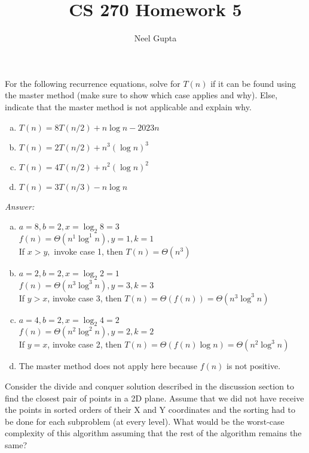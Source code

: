 \documentclass[12pt]{article}
\newenvironment{problem}[2][Problem]{\begin{trivlist}
\item[\hskip \labelsep {\bfseries #1}\hskip \labelsep {\bfseries #2.}]}{\end{trivlist}}
\begin{document}

\title{\vspace{-4cm}CS 270 Homework 5}
\author{Neel Gupta} 
\maketitle

\begin{problem}{1}
    For the following recurrence equations, solve for $T(n)$ if it can be found using the master method (make sure to show which case applies and why). Else, indicate that the master method is not applicable and explain why.
    \begin{enumerate}[(a)]
        \item $T(n) = 8T(n/2) + n\log n - 2023n$
        \item $T(n)=2T(n/2)+n^3 (\log n)^3$
        \item $T(n)=4T(n/2)+n^2 (\log n)^2$
        \item $T(n)=3T(n/3)-n\log n$
    \end{enumerate}
\end{problem}
\textit{Answer:}
\begin{enumerate}[(a)]
    \item $a=8, b=2, x = \log_2 8 = 3$ \\ $f(n) = \Theta(n^1\log^1 n), y=1,k=1$ \\ If $x>y,$ invoke case 1, then $T(n)=\Theta(n^3)$
    \item $a=2,b=2, x=\log_2 2=1$ \\ $f(n) = \Theta(n^3\log^3 n), y=3,k=3$\\ If $y>x$, invoke case 3, then $T(n)=\Theta(f(n)) = \Theta(n^3\log^3 n)$
    \item $a=4,b=2,x = \log_2 4 = 2$  \\ $f(n) = \Theta(n^2\log^2 n), y=2,k=2$ \\ If $y=x$, invoke case 2, then $T(n) = \Theta(f(n)\log n) =\Theta(n^2\log ^3 n)$
    \item The master method does not apply here because $f(n)$ is not positive.
\end{enumerate}
\begin{problem}{2}
    Consider the divide and conquer solution described in the discussion section to find the closest pair of points in a 2D plane. Assume that we did not have receive the points in sorted orders of their X and Y coordinates and the sorting had to be done for each subproblem (at every level). What would be the worst-case complexity of this algorithm assuming that the rest of the algorithm remains the same?
\end{problem}
\end{document}
